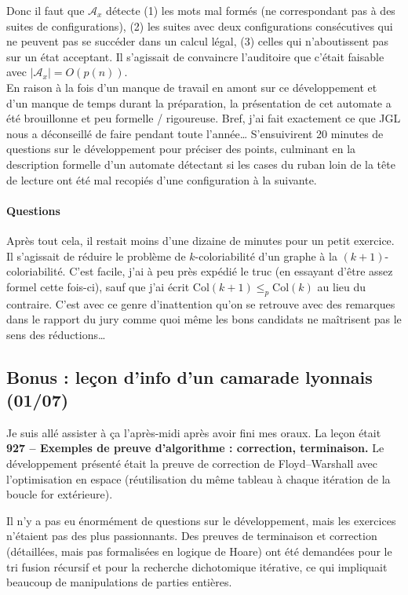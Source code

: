 \documentclass[a4paper, 11pt]{article}
\begin{document}
Donc il faut que $\mathcal{A}_x$ détecte (1) les mots mal formés (ne correspondant
pas à des suites de configurations), (2) les suites avec deux configurations
consécutives qui ne peuvent pas se succéder dans un calcul légal, (3) celles qui
n'aboutissent pas sur un état acceptant. Il s'agissait de convaincre l'auditoire
que c'était faisable avec $|\mathcal{A}_x| = O(p(n))$. \\

En raison à la fois d'un manque de travail en amont sur ce développement et d'un
manque de temps durant la préparation, la présentation de cet automate a été
brouillonne et peu formelle / rigoureuse. Bref, j'ai fait exactement ce que JGL
nous a déconseillé de faire pendant toute l'année… S'ensuivirent 20 minutes de
questions sur le développement pour préciser des points, culminant en la
description formelle d'un automate détectant si les cases du ruban loin de la
tête de lecture ont été mal recopiés d'une configuration à la suivante.

\paragraph{Questions}

Après tout cela, il restait moins d'une dizaine de minutes pour un petit
exercice. Il s'agissait de réduire le problème de $k$-coloriabilité d'un graphe
à la $(k+1)$-coloriabilité. C'est facile, j'ai à peu près expédié le truc (en
essayant d'être assez formel cette fois-ci), sauf que j'ai écrit
$\mathrm{Col}(k+1) \leq_p \mathrm{Col}(k)$ au lieu du contraire. C'est avec ce
genre d'inattention qu'on se retrouve avec des remarques dans le rapport du jury
comme quoi même les bons candidats ne maîtrisent pas le sens des réductions…

\subsection*{Bonus : leçon d'info d'un camarade lyonnais (01/07)}

Je suis allé assister à ça l'après-midi après avoir fini mes oraux. La leçon
était \textbf{927 -- Exemples de preuve d'algorithme : correction, terminaison.}
Le développement présenté était la preuve de correction de Floyd--Warshall avec
l'optimisation en espace (réutilisation du même tableau à chaque itération de la
boucle for extérieure).

Il n'y a pas eu énormément de questions sur le développement, mais les exercices
n'étaient pas des plus passionnants. Des preuves de terminaison et correction
(détaillées, mais pas formalisées en logique de Hoare) ont été demandées pour le
tri fusion récursif et pour la recherche dichotomique itérative, ce qui
impliquait beaucoup de manipulations de parties entières.
\end{document}
